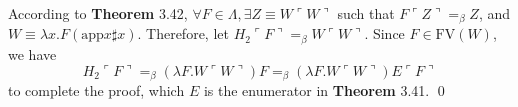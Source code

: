 \begin{pf} \rm
\newcommand{\ncode}[1]{\ulcorner #1\urcorner}
\newcommand{\eqbeta}{=_\beta}
\newcommand{\W}{\lambda x.F(\text{app}x\sharp x)}

According to \textbf{Theorem} 3.42, $\forall F\in\Lambda, \exists Z\equiv W\ncode{W}$ such that $F\ncode{Z}\eqbeta Z$, and $W\equiv\W$. Therefore, let $H_2\ncode{F}\eqbeta W\ncode{W}$. Since $F\in\text{FV}(W)$, we have $$H_2\ncode{F}\eqbeta(\lambda F.W\ncode{W})F\eqbeta(\lambda F.W\ncode{W})E\ncode{F}$$ to complete the proof, which $E$ is the enumerator in \textbf{Theorem} 3.41. \qed 
\end{pf}
